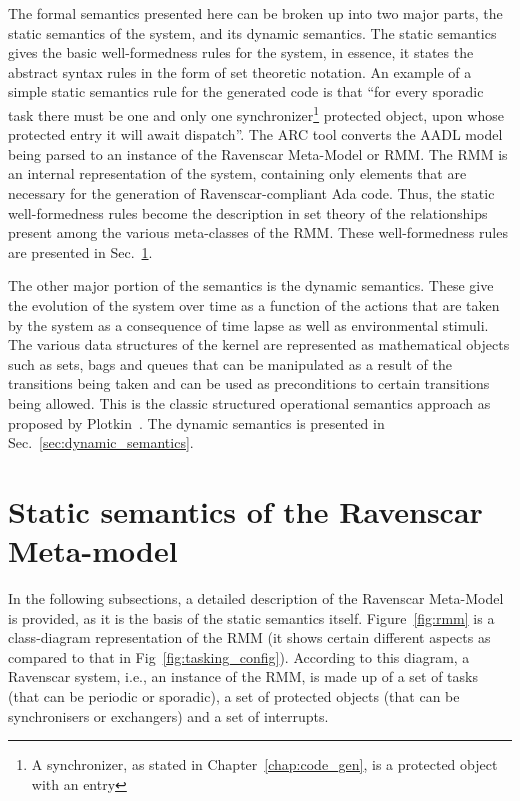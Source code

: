 The formal semantics presented here can be broken up into two major
parts, the static semantics of the system, and its dynamic
semantics. The static semantics gives the basic well-formedness rules
for the system, in essence, it states the abstract syntax rules in the
form of set theoretic notation. An example of a simple static
semantics rule for the generated code is that ``for every sporadic
task there must be one and only one synchronizer\footnote{A
  synchronizer, as stated in Chapter~\ref{chap:code_gen}, is a
  protected object with an entry} protected object, upon whose
protected entry it will await dispatch''. The ARC tool converts the
AADL model being parsed to an instance of the Ravenscar Meta-Model or
RMM. The RMM is an internal representation of the system, containing
only elements that are necessary for the generation of
Ravenscar-compliant Ada code. Thus, the static well-formedness rules
become the description in set theory of the relationships present
among the various meta-classes of the RMM. These well-formedness rules
are presented in Sec.~\ref{sec:static_semantics}.

The other major portion of the semantics is the dynamic
semantics. These give the evolution of the system over time as a
function of the actions that are taken by the system as a consequence
of time lapse as well as environmental stimuli. The various data
structures of the kernel are represented as mathematical objects such
as sets, bags and queues that can be manipulated as a result of the
transitions being taken and can be used as preconditions to certain
transitions being allowed. This is the classic structured operational
semantics approach as proposed by Plotkin~\cite{plotkin-sos}. The
dynamic semantics is presented in Sec.~\ref{sec:dynamic_semantics}.

\section{Static semantics of the Ravenscar Meta-model}
\label{sec:static_semantics}

In the following subsections, a detailed description of the Ravenscar
Meta-Model is provided, as it is the basis of the static semantics
itself. Figure~\ref{fig:rmm} is a class-diagram representation of the
RMM (it shows certain different aspects as compared to that in
Fig~\ref{fig:tasking_config}). According to this diagram, a Ravenscar
system, i.e., an instance of the RMM, is made up of a set of tasks
(that can be periodic or sporadic), a set of protected objects (that
can be synchronisers or exchangers) and a set of interrupts.

